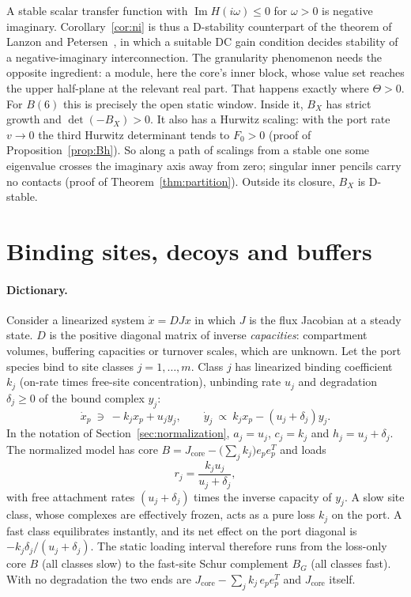 \documentclass[11pt,a4paper]{article}
\theoremstyle{plain}
\theoremstyle{definition}
\theoremstyle{remark}
\newcommand{\Imag}{\operatorname{Im}}
\newcommand{\Core}{\Theta}
\begin{document}
A stable scalar transfer function with $\Imag H(i\omega)\le0$ for $\omega>0$
is negative imaginary. Corollary~\ref{cor:ni} is thus a D-stability counterpart of
the theorem of Lanzon and Petersen~\cite{lanzon2008,xiong2010}, in which a
suitable DC gain condition decides stability of a negative-imaginary
interconnection. The granularity phenomenon needs the opposite ingredient: a
module, here the core's inner block, whose value set reaches the upper
half-plane at the relevant real part. That happens exactly where $\Core>0$. For
$B(6)$ this is precisely the open static window. Inside it, $B_X$ has strict
growth and $\det(-B_X)>0$. It also has a Hurwitz scaling: with the port rate
$v\to0$ the third Hurwitz determinant tends to $F_0>0$ (proof of
Proposition~\ref{prop:Bh}). So along a path of scalings from a stable one
some eigenvalue crosses the imaginary axis away from zero; singular inner pencils
carry no contacts (proof of Theorem~\ref{thm:partition}). Outside its closure,
$B_X$ is D-stable.

\section{Binding sites, decoys and buffers}\label{sec:application}

\paragraph{Dictionary.}
Consider a linearized system $\dot x=DJx$ in which $J$ is the flux Jacobian at
a steady state. $D$ is the positive diagonal matrix of inverse
\emph{capacities}: compartment volumes, buffering capacities or turnover
scales, which are unknown. Let the port species bind to site classes
$j=1,\dots,m$. Class $j$ has linearized binding coefficient $k_j$ (on-rate
times free-site concentration), unbinding rate $u_j$ and degradation
$\delta_j\ge0$ of the bound complex $y_j$:
\[
 \dot x_p\ \ni\ -k_jx_p+u_jy_j,\qquad \dot y_j\ \propto\ k_jx_p-(u_j+\delta_j)y_j .
\]
In the notation of Section~\ref{sec:normalization}, $a_j=u_j$, $c_j=k_j$ and
$h_j=u_j+\delta_j$. The normalized model has core
$B=J_{\mathrm{core}}-\bigl(\sum_jk_j\bigr)e_pe_p^{T}$ and loads
\[
 r_j=\frac{k_ju_j}{u_j+\delta_j},
\]
with free attachment rates $(u_j+\delta_j)$ times the inverse capacity of
$y_j$. A slow site class, whose complexes are effectively frozen, acts as a pure
loss $k_j$ on the port. A fast class equilibrates instantly, and its net
effect on the port diagonal is $-k_j\delta_j/(u_j+\delta_j)$. The static
loading interval therefore runs from the loss-only core $B$ (all classes slow)
to the fast-site Schur complement $B_G$ (all classes fast). With no degradation
the two ends are $J_{\mathrm{core}}-\sum_jk_j\,e_pe_p^{T}$ and
$J_{\mathrm{core}}$ itself.
\end{document}
